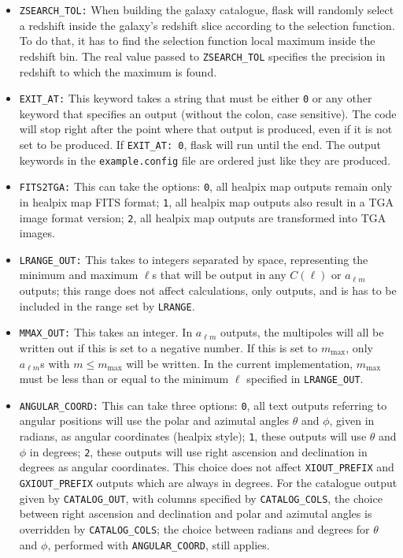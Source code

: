 \documentclass[12pt]{book} %
\newcommand{\nv}[1]{\mathrm{#1}}                 %
\begin{document}
\begin{itemize}
\item {\tt ZSEARCH\_TOL:} When building the galaxy catalogue, {\sc flask} will randomly select 
  a redshift inside the galaxy's redshift slice according to the selection function. To do that, 
  it has to find the selection function local maximum inside the redshift bin. The real value 
  passed to {\tt ZSEARCH\_TOL} specifies the precision in redshift to which the maximum is found.

\item {\tt EXIT\_AT:} This keyword takes a string that must be either {\tt 0} or any other keyword
  that specifies an output (without the colon, case sensitive). The code will stop right after 
  the point where that output is produced, even if it is not set to be produced. If {\tt EXIT\_AT: 0}, 
  {\sc flask} will run until the end. The output keywords in the {\tt example.config} file 
  are ordered just like they are produced.

\item {\tt FITS2TGA:} This can take the options: {\tt 0}, all {\sc healpix} map outputs remain only 
  in {\sc healpix} map FITS format; {\tt 1}, all {\sc healpix} map outputs also result in a TGA
  image format version; {\tt 2}, all {\sc healpix} map outputs are transformed into TGA images.

\item {\tt LRANGE\_OUT:} This takes to integers separated by space, representing the minimum and 
  maximum $\ell$s that will be output in any $C(\ell)$ or $a_{\ell m}$ outputs; this range does 
  not affect calculations, only outputs, and is has to be included in the range set by {\tt LRANGE}.
  
\item {\tt MMAX\_OUT:} This takes an integer. In $a_{\ell m}$ outputs, the multipoles will all 
  be written out if this is set to a negative number. If this is set to $m_{\nv{max}}$, only $a_{\ell m}$s 
  with $m\leq m_{\nv{max}}$ will be written. In the current implementation, $m_{\nv{max}}$ must be less than 
  or equal to the minimum $\ell$ specified in {\tt LRANGE\_OUT}.

\item {\tt ANGULAR\_COORD:} This can take three options: {\tt 0}, all text outputs referring 
  to angular positions will use the polar and azimutal angles $\theta$ and $\phi$, given in radians, 
  as angular coordinates ({\sc healpix} style); {\tt 1}, these outputs will use $\theta$ and $\phi$ 
  in degrees; {\tt 2}, these outputs will use right ascension and declination in degrees as 
  angular coordinates. This choice does not affect {\tt XIOUT\_PREFIX} and {\tt GXIOUT\_PREFIX} 
  outputs which are always in degrees. For the catalogue output given by {\tt CATALOG\_OUT}, 
  with columns specified by {\tt CATALOG\_COLS}, the choice between right ascension and declination and 
  polar and azimutal angles is overridden by {\tt CATALOG\_COLS}; the choice between radians and degrees 
  for $\theta$ and $\phi$, performed with {\tt ANGULAR\_COORD}, still applies.


\end{itemize}
\end{document}
